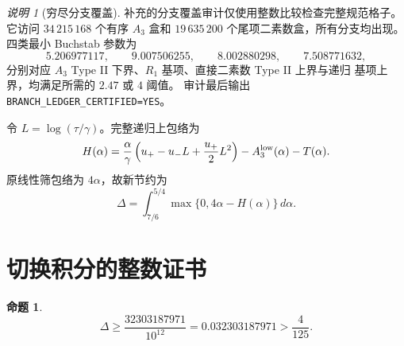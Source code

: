 \documentclass[UTF8,10pt,a4paper]{ctexart}
\newcommand{\1}{\mathbf{1}}
\newtheorem{proposition}[theorem]{命题}
\theoremstyle{remark}
\newtheorem{remark}[theorem]{说明}
\begin{document}
\begin{remark}[穷尽分支覆盖]\label{rem:branch-coverage-zh}
补充的分支覆盖审计仅使用整数比较检查完整规范格子。它访问
$34\,215\,168$ 个有序 $A_3$ 盒和
$19\,635\,200$ 个尾项二素数盒，所有分支均出现。四类最小 Buchstab 参数为
\[
 5.206977117,\qquad 9.007506255,\qquad
 8.002880298,\qquad 7.508771632,
\]
分别对应 $A_3$ Type II 下界、$R_1$ 基项、直接二素数 Type II 上界与递归
基项上界，均满足所需的 $2.47$ 或 $4$ 阈值。
审计最后输出
\texttt{BRANCH\_LEDGER\_CERTIFIED=YES}。
\end{remark}

令 $L=\log(\tau/\gamma)$。完整递归上包络为
\begin{equation}\label{eq:H-zh}
 H(\alpha)=\frac{\alpha}{\gamma}
 \left(u_+-u_-L+\frac{u_+}{2}L^2\right)
 -A_3^{\rm low}(\alpha)-T(\alpha).
\end{equation}
原线性筛包络为 $4\alpha$，故新节约为
\begin{equation}\label{eq:Delta-zh}
 \Delta=\int_{7/6}^{5/4}
 \max\{0,4\alpha-H(\alpha)\}\,d\alpha.
\end{equation}

\section{切换积分的整数证书}

\begin{proposition}\label{prop:certificate-zh}
\[
 \Delta\ge\frac{32303187971}{10^{12}}
 =0.032303187971>\frac4{125}.
\]
\end{proposition}
\end{document}
